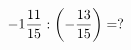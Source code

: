 \documentclass[preview]{standalone}
\begin{document}
\begin{align*}
-1 { 11 \over 15 }  :  \left( - { 13 \over 15 } \right)  =  ?
\end{align*}
\end{document}
